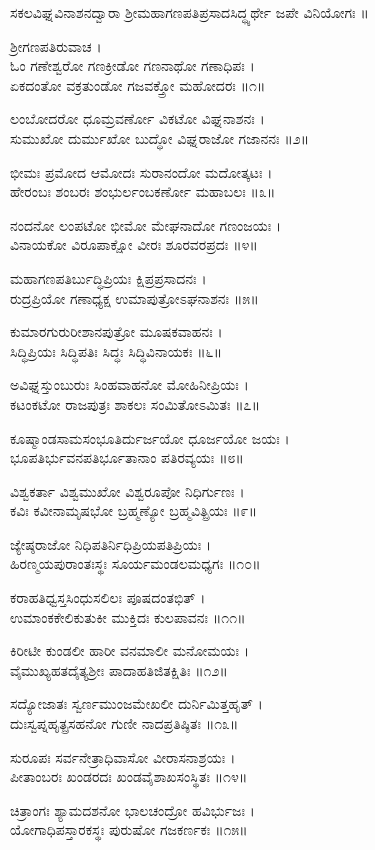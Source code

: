 ಸಕಲವಿಘ್ನವಿನಾಶನದ್ವಾರಾ ಶ್ರೀಮಹಾಗಣಪತಿಪ್ರಸಾದಸಿದ್ಧ್ಯರ್ಥೇ ಜಪೇ ವಿನಿಯೋಗಃ ॥

ಶ್ರೀಗಣಪತಿರುವಾಚ ।\\
ಓಂ ಗಣೇಶ್ವರೋ ಗಣಕ್ರೀಡೋ ಗಣನಾಥೋ ಗಣಾಧಿಪಃ ।\\
ಏಕದಂತೋ ವಕ್ರತುಂಡೋ ಗಜವಕ್ತ್ರೋ ಮಹೋದರಃ ॥೧॥

ಲಂಬೋದರೋ ಧೂಮ್ರವರ್ಣೋ ವಿಕಟೋ ವಿಘ್ನನಾಶನಃ ।\\
ಸುಮುಖೋ ದುರ್ಮುಖೋ ಬುದ್ಧೋ ವಿಘ್ನರಾಜೋ ಗಜಾನನಃ ॥೨॥

ಭೀಮಃ ಪ್ರಮೋದ ಆಮೋದಃ ಸುರಾನಂದೋ ಮದೋತ್ಕಟಃ ।\\
ಹೇರಂಬಃ ಶಂಬರಃ ಶಂಭುರ್ಲಂಬಕರ್ಣೋ ಮಹಾಬಲಃ ॥೩॥

ನಂದನೋ ಲಂಪಟೋ ಭೀಮೋ ಮೇಘನಾದೋ ಗಣಂಜಯಃ ।\\
ವಿನಾಯಕೋ ವಿರೂಪಾಕ್ಷೋ ವೀರಃ ಶೂರವರಪ್ರದಃ ॥೪॥

ಮಹಾಗಣಪತಿರ್ಬುದ್ಧಿಪ್ರಿಯಃ ಕ್ಷಿಪ್ರಪ್ರಸಾದನಃ ।\\
ರುದ್ರಪ್ರಿಯೋ ಗಣಾಧ್ಯಕ್ಷ ಉಮಾಪುತ್ರೋಽಘನಾಶನಃ ॥೫॥

ಕುಮಾರಗುರುರೀಶಾನಪುತ್ರೋ ಮೂಷಕವಾಹನಃ ।\\
ಸಿದ್ಧಿಪ್ರಿಯಃ ಸಿದ್ಧಿಪತಿಃ ಸಿದ್ಧಃ ಸಿದ್ಧಿವಿನಾಯಕಃ ॥೬॥

ಅವಿಘ್ನಸ್ತುಂಬುರುಃ ಸಿಂಹವಾಹನೋ ಮೋಹಿನೀಪ್ರಿಯಃ ।\\
ಕಟಂಕಟೋ ರಾಜಪುತ್ರಃ ಶಾಕಲಃ ಸಂಮಿತೋಽಮಿತಃ ॥೭॥

ಕೂಷ್ಮಾಂಡಸಾಮಸಂಭೂತಿರ್ದುರ್ಜಯೋ ಧೂರ್ಜಯೋ ಜಯಃ ।\\
ಭೂಪತಿರ್ಭುವನಪತಿರ್ಭೂತಾನಾಂ ಪತಿರವ್ಯಯಃ ॥೮॥

ವಿಶ್ವಕರ್ತಾ ವಿಶ್ವಮುಖೋ ವಿಶ್ವರೂಪೋ ನಿಧಿರ್ಗುಣಃ ।\\
ಕವಿಃ ಕವೀನಾಮೃಷಭೋ ಬ್ರಹ್ಮಣ್ಯೋ ಬ್ರಹ್ಮವಿತ್ಪ್ರಿಯಃ ॥೯॥

ಜ್ಯೇಷ್ಠರಾಜೋ ನಿಧಿಪತಿರ್ನಿಧಿಪ್ರಿಯಪತಿಪ್ರಿಯಃ ।\\
ಹಿರಣ್ಮಯಪುರಾಂತಃಸ್ಥಃ ಸೂರ್ಯಮಂಡಲಮಧ್ಯಗಃ ॥೧೦॥

ಕರಾಹತಿಧ್ವಸ್ತಸಿಂಧುಸಲಿಲಃ ಪೂಷದಂತಭಿತ್ ।\\
ಉಮಾಂಕಕೇಲಿಕುತುಕೀ ಮುಕ್ತಿದಃ ಕುಲಪಾವನಃ ॥೧೧॥

ಕಿರೀಟೀ ಕುಂಡಲೀ ಹಾರೀ ವನಮಾಲೀ ಮನೋಮಯಃ ।\\
ವೈಮುಖ್ಯಹತದೈತ್ಯಶ್ರೀಃ ಪಾದಾಹತಿಜಿತಕ್ಷಿತಿಃ ॥೧೨॥

ಸದ್ಯೋಜಾತಃ ಸ್ವರ್ಣಮುಂಜಮೇಖಲೀ ದುರ್ನಿಮಿತ್ತಹೃತ್ ।\\
ದುಃಸ್ವಪ್ನಹೃತ್ಪ್ರಸಹನೋ ಗುಣೀ ನಾದಪ್ರತಿಷ್ಠಿತಃ ॥೧೩॥

ಸುರೂಪಃ ಸರ್ವನೇತ್ರಾಧಿವಾಸೋ ವೀರಾಸನಾಶ್ರಯಃ ।\\
ಪೀತಾಂಬರಃ ಖಂಡರದಃ ಖಂಡವೈಶಾಖಸಂಸ್ಥಿತಃ ॥೧೪॥

ಚಿತ್ರಾಂಗಃ ಶ್ಯಾಮದಶನೋ ಭಾಲಚಂದ್ರೋ ಹವಿರ್ಭುಜಃ ।\\
ಯೋಗಾಧಿಪಸ್ತಾರಕಸ್ಥಃ ಪುರುಷೋ ಗಜಕರ್ಣಕಃ ॥೧೫॥

